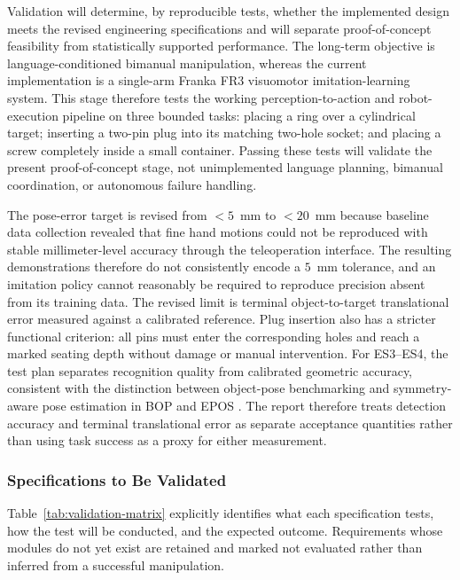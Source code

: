 \documentclass[12pt, letterpaper]{article}
\begin{document}
Validation will determine, by reproducible tests, whether the implemented
design meets the revised engineering specifications and will separate
proof-of-concept feasibility from statistically supported performance. The
long-term objective is language-conditioned bimanual manipulation, whereas the
current implementation is a single-arm Franka FR3 visuomotor imitation-learning
system. This stage therefore tests the working perception-to-action and
robot-execution pipeline on three bounded tasks: placing a ring over a
cylindrical target; inserting a two-pin plug into its matching two-hole
socket; and placing a screw completely inside a small container. Passing these
tests will validate the present proof-of-concept stage, not unimplemented
language planning, bimanual coordination, or autonomous failure handling.

The pose-error target is revised from $<5$~mm to $<20$~mm because baseline data
collection revealed that fine hand motions could not be reproduced with stable
millimeter-level accuracy through the teleoperation interface. The resulting
demonstrations therefore do not consistently encode a $5$~mm tolerance, and an
imitation policy cannot reasonably be required to reproduce precision absent
from its training data. The revised limit is terminal object-to-target
translational error measured against a calibrated reference. Plug insertion
also has a stricter functional criterion: all pins must enter the corresponding
holes and reach a marked seating depth without damage or manual intervention.
For ES3--ES4, the test plan separates recognition quality from calibrated geometric accuracy, consistent with the distinction between object-pose benchmarking and symmetry-aware pose estimation in BOP and EPOS \cite{bop,epos}. The report therefore treats detection accuracy and terminal translational error as separate acceptance quantities rather than using task success as a proxy for either measurement.

\subsubsection{Specifications to Be Validated}

Table~\ref{tab:validation-matrix} explicitly identifies what each specification
tests, how the test will be conducted, and the expected outcome. Requirements
whose modules do not yet exist are retained and marked not evaluated rather
than inferred from a successful manipulation.
\end{document}
